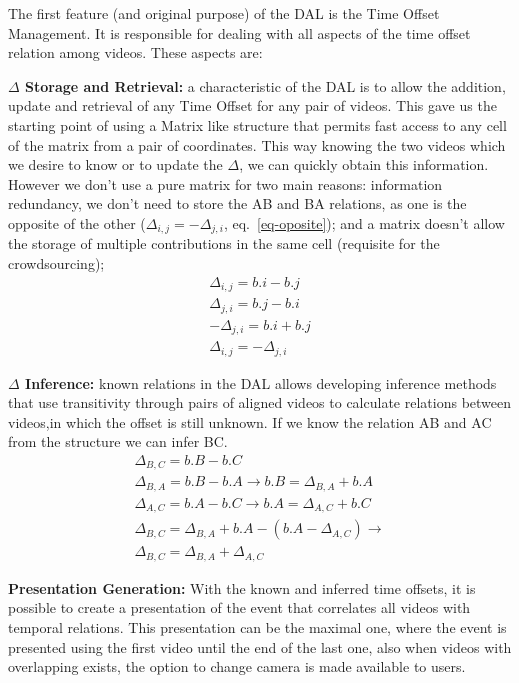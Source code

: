 The first feature (and original purpose) of the DAL is the Time Offset Management. It is responsible for dealing with all aspects of the time offset relation among videos. These aspects are:

	\textbf{$\Delta$ Storage and Retrieval:} a characteristic of the DAL is to allow the addition, update and retrieval of any Time Offset for any pair of videos. This gave us the starting point of using a Matrix like structure that permits fast access to any cell of the matrix  from a pair of coordinates. This way knowing the two videos which we desire to know or to update the $\Delta$, we can quickly obtain this information. However we don't use a pure matrix for two main reasons: information redundancy, we don't need to store the AB and BA relations, as one is the opposite of the other ($\Delta_{i,j} = -\Delta_{j,i}$, eq.~\ref{eq-oposite}); and a matrix doesn't allow the storage of multiple contributions in the same cell (requisite for the crowdsourcing);
\begin{eqnarray}
	\label{eq-oposite}
	\Delta_{i,j} = b.i - b.j	\nonumber \\
	\Delta_{j,i} = b.j - b.i	\nonumber \\
	-\Delta_{j,i} = b.i + b.j	\nonumber \\
	\Delta_{i,j} = -\Delta_{j,i}
\end{eqnarray}

	\textbf{$\Delta$ Inference:} known relations in the DAL allows developing inference methods that use transitivity through pairs of aligned videos to calculate relations between videos,in which the offset is still unknown. If we know the relation AB and AC from the structure we can infer BC.	
\begin{eqnarray}
	\label{dina-i}
	\Delta_{B,C} = b.B - b.C	\nonumber \\
	\Delta_{B,A} = b.B - b.A \rightarrow b.B = \Delta_{B,A} + b.A	\nonumber \\
	\Delta_{A,C} = b.A - b.C \rightarrow b.A = \Delta_{A,C} + b.C	\nonumber \\
	\Delta_{B,C}= \Delta_{B,A} + b.A - (b.A-\Delta_{A,C}) \rightarrow \nonumber \\ \Delta_{B,C} = \Delta_{B,A} + \Delta_{A,C}	
\end{eqnarray}

	\textbf{Presentation Generation:} With the known and inferred time offsets, it is possible to create a presentation of the event that correlates all videos with temporal relations. This presentation can be the maximal one, where the event is presented using the first video until the end of the last one, also when videos with overlapping exists, the option to change camera is made available to users.